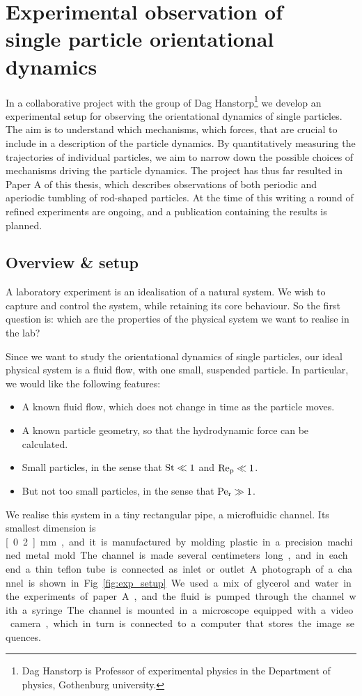\documentclass[thesis.tex]{subfiles}
\begin{document}
\chapter{Experimental observation of \\single particle orientational dynamics}

In a collaborative project with the group of Dag Hanstorp\footnote{Dag Hanstorp is Professor of experimental physics in the Department of physics, Gothenburg university.} we develop an experimental setup for observing the orientational dynamics of single particles. The aim is to understand which mechanisms, which forces, that are crucial to include in a description of the particle dynamics. By quantitatively measuring the trajectories of individual particles, we aim to narrow down the possible choices of mechanisms driving the particle dynamics. The project has thus far resulted in Paper A of this thesis, which describes observations of both periodic and aperiodic tumbling of rod-shaped particles. At the time of this writing a round of refined experiments are ongoing, and a publication containing the results is planned.

\section{Overview \& setup}

A laboratory experiment is an idealisation of a natural system. We wish to capture and control the system, while retaining its core behaviour. So the first question is: which are the properties of the physical system we want to realise in the lab?

Since we want to study the orientational dynamics of single particles, our ideal physical system is a fluid flow, with one small, suspended particle. In particular, we would like the following features:
\begin{itemize}
	\item A known fluid flow, which does not change in time as the particle moves.
	\item A known particle geometry, so that the hydrodynamic force can be calculated.
	\item Small particles, in the sense that $\mbox{St}\ll1$ and $\mbox{Re}_{\mathrm p}\ll1$.
	\item But not too small particles, in the sense that $\mbox{Pe}_{\mathrm r}\gg1$.
\end{itemize}
We realise this system in a tiny rectangular pipe, a microfluidic channel. Its smallest dimension is \unit[0.2]{mm}, and it is manufactured by molding plastic in a precision machined metal mold. The channel is made several centimeters long, and in each end a thin teflon tube is connected as inlet or outlet. A photograph of a channel is shown in Fig.~\ref{fig:exp_setup}. We used a mix of glycerol and water in the experiments of paper A, and the fluid is pumped through the channel with a syringe. The channel is mounted in a microscope equipped with a video camera, which in turn is connected to a computer that stores the image sequences.
\end{document}
